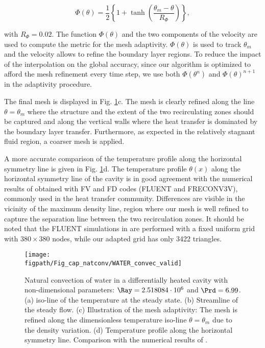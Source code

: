\begin{equation}
\Phi(\theta) =  \frac{1}{2}\left\{
1 + \tanh\left(\frac{\theta_m-\theta}{R_{\Phi}}\right)
\right\},
\label{eq-Stm}
\end{equation} 

\noindent with $R_{\Phi}=0.02$. 
The function $\Phi(\theta)$ and the two components of the velocity are used to compute the metric for the mesh adaptivity.
$\Phi(\theta)$ is used to track $\theta_m$ and the velocity allows to refine the boundary layer regions.
To reduce the impact of the interpolation on the global accuracy, since our algorithm is optimized to afford the mesh refinement every time step, we use both $\Phi(\theta^n)$ and $\Phi(\theta)^{n+1}$ in the adaptivity procedure.

\noindent The final mesh is displayed in Fig. \ref{fig-T1w-isoT}c.
The mesh is clearly refined along the line $\theta = \theta_m$ where  the structure and the extent of the two recirculating zones should be captured and along the vertical walls where the heat transfer is dominated by the boundary layer transfer.
Furthermore, as expected in the relatively stagnant fluid region, a coarser mesh is applied.

A more accurate comparison of the temperature profile along the horizontal symmetry line is given in Fig. \ref{fig-T1w-isoT}d. 
The temperature profile $\theta(x)$ along the horizontal symmetry line of the cavity is in good agreement with the numerical results   of \cite{Kowalewski-2003} obtained with FV and FD codes (FLUENT and FRECONV3V), commonly used in the heat transfer community. Differences are visible in the vicinity of the maximum density line, region where our mesh is well refined to capture the separation line between the two recirculation zones. It should be noted that the FLUENT simulations in \cite{Kowalewski-2003} are performed with a fixed uniform grid with $380\times380$ nodes, while our adapted grid has only 3422 triangles.

\begin{figure}
	\begin{center}
		\texttt{[image: \\figpath/Fig\_cap\_natconv/WATER\_convec\_valid]}
	\end{center}
	\caption{Natural convection of water in a differentially heated cavity with non-dimensional parameters: $\Ray=2.518084\cdot 10^{6}$ and $\Prd=6.99$. (a) iso-line of the temperature at the steady state. (b) Streamline of the steady flow. (c) Illustration of the mesh adaptivity: The mesh is refined along the dimensionless temperature iso-line $\theta = \theta_m$ due to the density variation. (d) Temperature profile along the horizontal symmetry line. Comparison with the numerical results of \cite{Kowalewski-2003}.}
	\label{fig-T1w-isoT} %
\end{figure}

